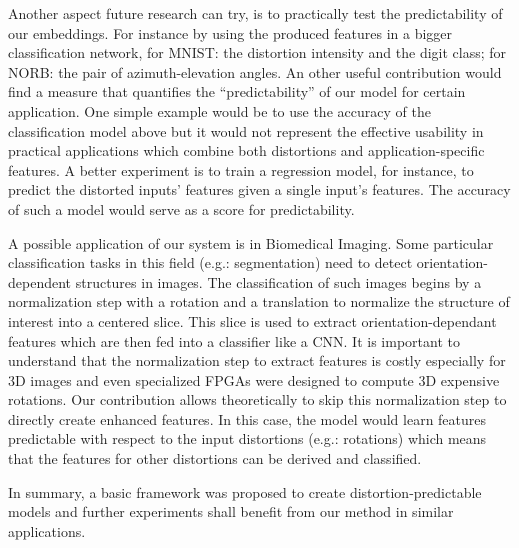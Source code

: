 \documentclass[a4paper,12pt]{report}
\newcommand{\eg}{e.g.}
\begin{document}
Another aspect future research can try, is to practically test the predictability of our embeddings.
For instance by using the produced features in a bigger classification network, for MNIST: the distortion intensity and the digit class; for NORB: the pair of azimuth-elevation angles.
An other useful contribution would find a measure that quantifies the ``predictability'' of our model for certain application.
One simple example would be to use the accuracy of the classification model above but it would not represent the effective usability in practical applications which combine both distortions and application-specific features.
A better experiment is to train a regression model, for instance, to predict the distorted inputs' features given a single input's features.
The accuracy of such a model would serve as a score for predictability.


A possible application of our system is in Biomedical Imaging.
Some particular classification tasks in this field (\eg: segmentation) need to detect orientation-dependent structures in images.
The classification of such images begins by a normalization step with a rotation and a translation to normalize the structure of interest into a centered slice.
This slice is used to extract orientation-dependant features which are then fed into a classifier like a CNN.
It is important to understand that the normalization step to extract features is costly especially for 3D images and even specialized FPGAs were designed to compute 3D expensive rotations.
Our contribution allows theoretically to skip this normalization step to directly create enhanced features.
In this case, the model would learn features predictable with respect to the input distortions (\eg: rotations) which means that the features for other distortions can be derived and classified.

In summary, a basic framework was proposed to create distortion-predictable models and further experiments shall benefit from our method in similar applications.


{}


\nocite{lecun2004learning}
\end{document}
